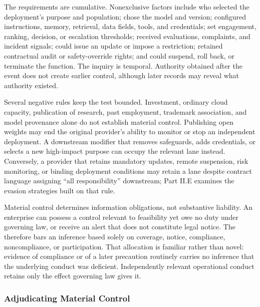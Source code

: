 The requirements are cumulative. Nonexclusive factors include who selected the deployment's purpose and population; chose the model and version; configured instructions, memory, retrieval, data fields, tools, and credentials; set engagement, ranking, decision, or escalation thresholds; received evaluations, complaints, and incident signals; could issue an update or impose a restriction; retained contractual audit or safety-override rights; and could suspend, roll back, or terminate the function. The inquiry is temporal. Authority obtained after the event does not create earlier control, although later records may reveal what authority existed.

Several negative rules keep the test bounded. Investment, ordinary cloud capacity, publication of research, past employment, trademark association, and model provenance alone do not establish material control. Publishing open weights may end the original provider's ability to monitor or stop an independent deployment. A downstream modifier that removes safeguards, adds credentials, or selects a new high-impact purpose can occupy the relevant lane instead. Conversely, a provider that retains mandatory updates, remote suspension, risk monitoring, or binding deployment conditions may retain a lane despite contract language assigning ``all responsibility'' downstream; Part II.E examines the evasion strategies built on that rule.

Material control determines information obligations, not substantive liability. An enterprise can possess a control relevant to feasibility yet owe no duty under governing law, or receive an alert that does not constitute legal notice. The  therefore bars an inference based solely on coverage, notice, compliance, noncompliance, or participation. That allocation is familiar rather than novel: evidence of compliance or of a later precaution routinely carries no inference that the underlying conduct was deficient. Independently relevant operational conduct retains only the effect governing law gives it.

\subsubsection{Adjudicating Material Control}

